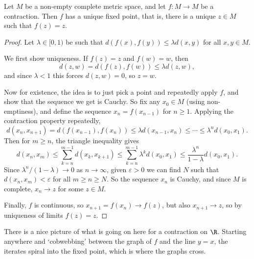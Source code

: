 \begin{theorem}\label{antop-thm:contraction}
    Let $M$ be a non-empty complete metric space, and let $f: M \rightarrow M$ be a contraction. Then $f$ has a unique fixed point, that is, there is a unique $z \in M$ such that $f(z) = z$.
\end{theorem}
\begin{proof}
    Let $\lambda \in [0, 1)$ be such that $d(f(x), f(y)) \leq \lambda d(x, y)$ for all $x, y \in M$.

    We first show uniqueness. If $f(z) = z$ and $f(w) = w$, then
    $$
    d(z, w) = d(f(z), f(w)) \leq \lambda d(z, w),
    $$
    and since $\lambda < 1$ this forces $d(z, w) = 0$, so $z = w$.

    Now for existence, the idea is to just pick a point and repeatedly apply $f$, and show that the sequence we get is Cauchy. So fix any $x_0 \in M$ (using non-emptiness), and define the sequence $x_n = f(x_{n - 1})$ for $n \geq 1$. Applying the contraction property repeatedly,
    $$
    d(x_n, x_{n + 1}) = d(f(x_{n-1}), f(x_n)) \leq \lambda d(x_{n - 1}, x_n) \leq \cdots \leq \lambda^n d(x_0, x_1).
    $$
    Then for $m \geq n$, the triangle inequality gives
    $$
    d(x_n, x_m) \leq \sum_{k = n}^{m - 1} d(x_k, x_{k + 1}) \leq \sum_{k = n}^{m - 1} \lambda^k d(x_0, x_1) \leq \frac{\lambda^n}{1 - \lambda} d(x_0, x_1).
    $$
    Since $\lambda^n/(1 - \lambda) \rightarrow 0$ as $n \rightarrow \infty$, given $\varepsilon > 0$ we can find $N$ such that $d(x_n, x_m) < \varepsilon$ for all $m \geq n \geq N$. So the sequence $x_n$ is Cauchy, and since $M$ is complete, $x_n \rightarrow z$ for some $z \in M$.

    Finally, $f$ is continuous, so $x_{n + 1} = f(x_n) \rightarrow f(z)$, but also $x_{n + 1} \rightarrow z$, so by uniqueness of limits $f(z) = z$.
\end{proof}

There is a nice picture of what is going on here for a contraction on $\R$. Starting anywhere and `cobwebbing' between the graph of $f$ and the line $y = x$, the iterates spiral into the fixed point, which is where the graphs cross.

